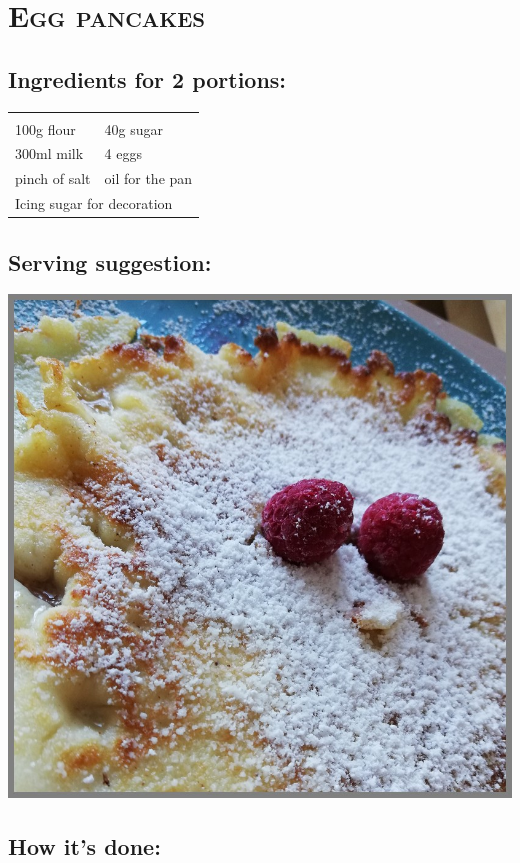 \section{\textsc{Egg pancakes}}

\subsection*{Ingredients for 2 portions:}

\begin{tabular}{p{7.5cm} p{7.5cm}}
	& \\
	100g flour & 40g sugar \\
	300ml milk & 4 eggs \\
	pinch of salt & oil for the pan \\
	\multicolumn{2}{l}{Icing sugar for decoration}
\end{tabular}

\subsection*{Serving suggestion:}

\includegraphics[width=\textwidth]{img/pancakes.jpg} \cite{pancakes}

\subsection*{How it's done:}

